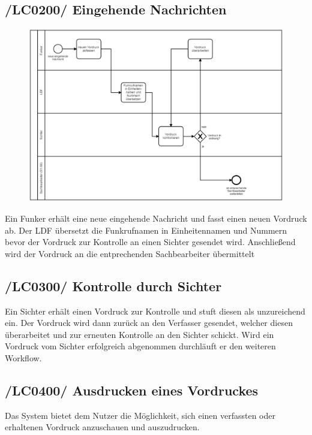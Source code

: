 \subsection{/LC0200/ Eingehende Nachrichten} 
\begin{figure}[htpb]
	\centering
	\includegraphics[width=0.95\linewidth]{eingehend.png}
\end{figure} Ein Funker erhält eine neue eingehende Nachricht und fasst einen neuen Vordruck ab. Der LDF übersetzt die Funkrufnamen in Einheitennamen und Nummern bevor der Vordruck zur Kontrolle an einen Sichter gesendet wird. Anschließend wird der Vordruck an die entprechenden Sachbearbeiter übermittelt

\subsection{/LC0300/ Kontrolle durch Sichter}
Ein Sichter erhält einen Vordruck zur Kontrolle und stuft diesen als unzureichend ein. Der Vordruck wird dann zurück an den Verfasser gesendet, welcher diesen überarbeitet und zur erneuten Kontrolle an den Sichter schickt. Wird ein Vordruck vom Sichter erfolgreich abgenommen durchläuft er den weiteren Workflow.

\subsection{/LC0400/ Ausdrucken eines Vordruckes}
Das System bietet dem Nutzer die Möglichkeit, sich einen verfassten oder erhaltenen Vordruck anzuschauen und auszudrucken.